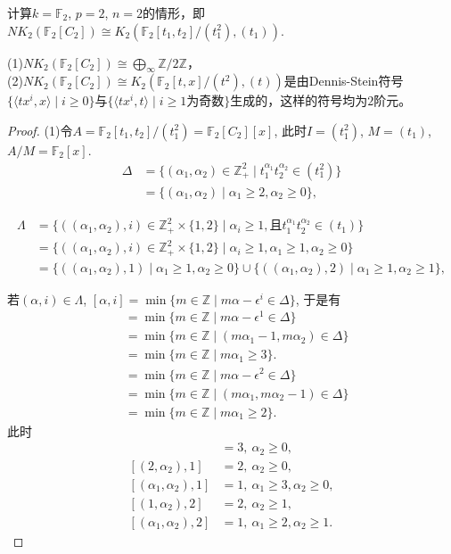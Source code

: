 计算$k=\mathbb{F}_2$, $p=2$, $n=2$的情形，即$NK_2(\mathbb{F}_2[C_2])\cong K_2(\mathbb{F}_2[t_1,t_2]/(t_1^2),(t_1))$.
\begin{theorem}
	(1)$NK_2(\mathbb{F}_2[C_2])\cong \bigoplus_{\infty} \mathbb{Z}/2 \mathbb{Z}$，\\
	(2)$NK_2(\mathbb{F}_2[C_2])\cong K_2(\mathbb{F}_2[t,x]/(t^2),(t))$是由Dennis-Stein符号$\{\langle tx^i,x \rangle \mid i\geq 0\}$与$\{\langle tx^i,t \rangle \mid i\geq 1\text{为奇数}\}$生成的，这样的符号均为$2$阶元。
\end{theorem}
\begin{proof}
	(1)令$A=\mathbb{F}_2[t_1,t_2]/(t_1^2)=\mathbb{F}_2[C_{2}][x]$, 此时$I=(t_1^2)$, $M=(t_1)$, $A/M=\mathbb{F}_2[x]$. 
\begin{align*}
\Delta &=\{(\alpha_1,\alpha_2)\in\mathbb{Z}_+^2\mid  t_1^{\alpha_1}t_2^{\alpha_2}\in (t_1^2)\}\\
	&=\{(\alpha_1,\alpha_2)\mid \alpha_1\geq 2, \alpha_2 \geq 0\},
\end{align*}

\begin{align*}
\Lambda &=\{((\alpha_1,\alpha_2),i)\in\mathbb{Z}_+^2 \times \{1,2\}\mid \alpha_i\geq 1, \text{且} t_1^{\alpha_1}t_2^{\alpha_2}\in (t_1)\} \\
	&=\{((\alpha_1,\alpha_2),i)\in\mathbb{Z}_+^2 \times \{1,2\}\mid \alpha_i\geq 1, \alpha_1\geq 1, \alpha_2\geq 0\} \\
	&=\{((\alpha_1,\alpha_2),1) \mid \alpha_1\geq 1, \alpha_2\geq 0\}\cup \{((\alpha_1,\alpha_2),2) \mid \alpha_1\geq 1, \alpha_2\geq 1\},
\end{align*}

若$(\alpha,i)\in \Lambda$, $[\alpha,i] = \min \{m\in \mathbb{Z}\mid m \alpha -\epsilon^i \in \Delta\}$, 于是有
\begin{align*}
[\alpha,1] & = \min \{m\in \mathbb{Z} \mid m \alpha -\epsilon^1 \in \Delta\} \\
& =\min \{m\in \mathbb{Z} \mid (m \alpha_1-1,m \alpha_2)\in \Delta\} \\
& =\min \{m\in \mathbb{Z} \mid m \alpha_1\geq 3\}.
\end{align*}
\begin{align*}
[\alpha,2] & = \min \{m\in \mathbb{Z} \mid m \alpha -\epsilon^2 \in \Delta\} \\
& =\min \{m\in \mathbb{Z} \mid (m \alpha_1,m \alpha_2-1)\in \Delta\} \\
& =\min \{m\in \mathbb{Z} \mid m \alpha_1\geq 2\}.
\end{align*}
此时
\begin{align*}
[(1,\alpha_2),1] & = 3, \ \alpha_2\geq 0, \\
[(2,\alpha_2),1] & = 2, \ \alpha_2\geq 0, \\
[(\alpha_1,\alpha_2),1] & = 1, \ \alpha_1\geq 3, \alpha_2\geq 0, \\
[(1,\alpha_2),2] & = 2, \ \alpha_2\geq 1, \\
[(\alpha_1,\alpha_2),2] & = 1, \ \alpha_1\geq 2, \alpha_2\geq 1.
\end{align*}




\end{proof}
